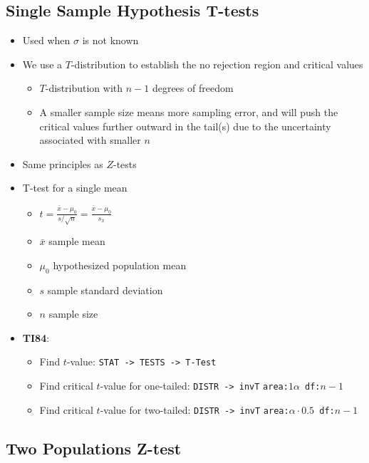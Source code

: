 \documentclass{article}
\newcommand{\code}[1]{\colorbox{light-gray}{\texttt{#1}}}
\begin{document}
\subsection{Single Sample Hypothesis T-tests}

\begin{itemize}
    \item Used when $\sigma$ is not known
    \item We use a $T$-distribution to establish the no rejection region and critical values
    \begin{itemize}
        \item $T$-distribution with $n-1$ degrees of freedom
        \item A smaller sample size means more sampling error, and will push the critical values further outward in the tail(s) due to the uncertainty associated with smaller $n$
    \end{itemize}
    \item Same principles as $Z$-tests
    \item T-test for a single mean
    \begin{itemize}
        \item $t=\frac{\bar{x} - \mu_0}{s / \sqrt{n}}=\frac{\bar{x} - \mu_0}{s_{\bar{x}}}$
        \item $\bar{x}$ sample mean
        \item $\mu_0$ hypothesized population mean
        \item $s$ sample standard deviation
        \item $n$ sample size
    \end{itemize}
    \item \textbf{TI84}:
    \begin{itemize}
        \item Find $t$-value: \code{STAT -> TESTS -> T-Test}
        \item Find critical $t$-value for one-tailed: \code{DISTR -> invT} \code{area:$1\alpha$ df:$n-1$}
        \item Find critical $t$-value for two-tailed: \code{DISTR -> invT} \code{area:$\alpha \cdot 0.5$ df:$n-1$}
    \end{itemize}
\end{itemize}

\subsection{Two Populations Z-test}
\end{document}

